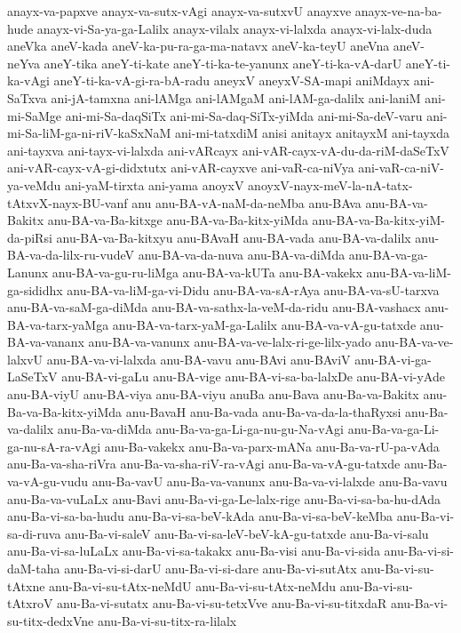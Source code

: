 {anayx-va-papxve
anayx-va-sutx-vAgi
anayx-va-sutxvU
anayxve
anayx-ve-na-ba-hude
anayx-vi-Sa-ya-ga-Lalilx
anayx-vilalx
anayx-vi-lalxda
anayx-vi-lalx-duda
aneVka
aneV-kada
aneV-ka-pu-ra-ga-ma-natavx
aneV-ka-teyU
aneVna
aneV-neYva
aneY-tika
aneY-ti-kate
aneY-ti-ka-te-yanunx
aneY-ti-ka-vA-darU
aneY-ti-ka-vAgi
aneY-ti-ka-vA-gi-ra-bA-radu
aneyxV
aneyxV-SA-mapi
aniMdayx
ani-SaTxva
ani-jA-tamxna
ani-lAMga
ani-lAMgaM
ani-lAM-ga-dalilx
ani-laniM
ani-mi-SaMge
ani-mi-Sa-daqSiTx
ani-mi-Sa-daq-SiTx-yiMda
ani-mi-Sa-deV-varu
ani-mi-Sa-liM-ga-ni-riV-kaSxNaM
ani-mi-tatxdiM
anisi
anitayx
anitayxM
ani-tayxda
ani-tayxva
ani-tayx-vi-lalxda
ani-vARcayx
ani-vAR-cayx-vA-du-da-riM-daSeTxV
ani-vAR-cayx-vA-gi-didxtutx
ani-vAR-cayxve
ani-vaR-ca-niVya
ani-vaR-ca-niV-ya-veMdu
ani-yaM-tirxta
ani-yama
anoyxV
anoyxV-nayx-meV-la-nA-tatx-tAtxvX-nayx-BU-vanf
anu
anu-BA-vA-naM-da-neMba
anu-BAva
anu-BA-va-Bakitx
anu-BA-va-Ba-kitxge
anu-BA-va-Ba-kitx-yiMda
anu-BA-va-Ba-kitx-yiM-da-piRsi
anu-BA-va-Ba-kitxyu
anu-BAvaH
anu-BA-vada
anu-BA-va-dalilx
anu-BA-va-da-lilx-ru-vudeV
anu-BA-va-da-nuva
anu-BA-va-diMda
anu-BA-va-ga-Lanunx
anu-BA-va-gu-ru-liMga
anu-BA-va-kUTa
anu-BA-vakekx
anu-BA-va-liM-ga-sididhx
anu-BA-va-liM-ga-vi-Didu
anu-BA-va-sA-rAya
anu-BA-va-sU-tarxva
anu-BA-va-saM-ga-diMda
anu-BA-va-sathx-la-veM-da-ridu
anu-BA-vashacx
anu-BA-va-tarx-yaMga
anu-BA-va-tarx-yaM-ga-Lalilx
anu-BA-va-vA-gu-tatxde
anu-BA-va-vananx
anu-BA-va-vanunx
anu-BA-va-ve-lalx-ri-ge-lilx-yado
anu-BA-va-ve-lalxvU
anu-BA-va-vi-lalxda
anu-BA-vavu
anu-BAvi
anu-BAviV
anu-BA-vi-ga-LaSeTxV
anu-BA-vi-gaLu
anu-BA-vige
anu-BA-vi-sa-ba-lalxDe
anu-BA-vi-yAde
anu-BA-viyU
anu-BA-viya
anu-BA-viyu
anuBa
anu-Bava
anu-Ba-va-Bakitx
anu-Ba-va-Ba-kitx-yiMda
anu-BavaH
anu-Ba-vada
anu-Ba-va-da-la-thaRyxsi
anu-Ba-va-dalilx
anu-Ba-va-diMda
anu-Ba-va-ga-Li-ga-nu-gu-Na-vAgi
anu-Ba-va-ga-Li-ga-nu-sA-ra-vAgi
anu-Ba-vakekx
anu-Ba-va-parx-mANa
anu-Ba-va-rU-pa-vAda
anu-Ba-va-sha-riVra
anu-Ba-va-sha-riV-ra-vAgi
anu-Ba-va-vA-gu-tatxde
anu-Ba-va-vA-gu-vudu
anu-Ba-vavU
anu-Ba-va-vanunx
anu-Ba-va-vi-lalxde
anu-Ba-vavu
anu-Ba-va-vuLaLx
anu-Bavi
anu-Ba-vi-ga-Le-lalx-rige
anu-Ba-vi-sa-ba-hu-dAda
anu-Ba-vi-sa-ba-hudu
anu-Ba-vi-sa-beV-kAda
anu-Ba-vi-sa-beV-keMba
anu-Ba-vi-sa-di-ruva
anu-Ba-vi-saleV
anu-Ba-vi-sa-leV-beV-kA-gu-tatxde
anu-Ba-vi-salu
anu-Ba-vi-sa-luLaLx
anu-Ba-vi-sa-takakx
anu-Ba-visi
anu-Ba-vi-sida
anu-Ba-vi-si-daM-taha
anu-Ba-vi-si-darU
anu-Ba-vi-si-dare
anu-Ba-vi-sutAtx
anu-Ba-vi-su-tAtxne
anu-Ba-vi-su-tAtx-neMdU
anu-Ba-vi-su-tAtx-neMdu
anu-Ba-vi-su-tAtxroV
anu-Ba-vi-sutatx
anu-Ba-vi-su-tetxVve
anu-Ba-vi-su-titxdaR
anu-Ba-vi-su-titx-dedxVne
anu-Ba-vi-su-titx-ra-lilalx
}
